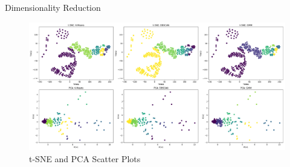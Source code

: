 \documentclass{beamer}
\begin{document}
\begin{frame}{Dimensionality Reduction}

 \begin{figure}
    \centering
        \includegraphics[width=1\textwidth]{img/dimensionality_reduction.png}
            \vspace{-6mm}
        \caption{t-SNE and PCA Scatter Plots}
\end{figure}

\end{frame}

\end{document}
